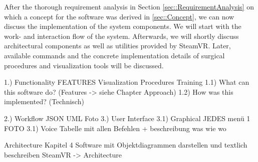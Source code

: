 After the thorough requirement analysis in Section \ref{sec::RequirementAnalysis} on which a concept for the software was derived in \ref{sec::Concept}, 
we can now discuss the implementation of the system components.
We will start with the work- and interaction flow of the system.
Afterwards, we will shortly discuss architectural components as well as utilities provided by SteamVR.
Later, available commands and the concrete implementation details of surgical procedures and visualization tools will be discussed.

1.) Functionality
FEATURES
Visualization
Procedures
Training
1.1) What can this software do? (Features -> siehe Chapter Approach)
1.2) How was this implemented? (Technisch)

2.) Workflow
JSON UML Foto
3.) User Interface
3.1) Graphical
JEDES menü 1 FOTO
3.1) Voice
Tabelle mit allen Befehlen + beschreibung was wie wo

Architecture Kapitel 4
Software mit Objektdiagrammen darstellen und textlich beschreiben
 SteamVR -> Architecture


